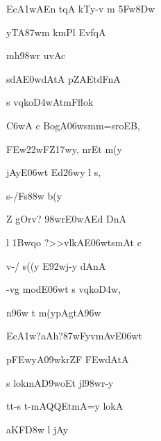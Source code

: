 \dnnemslokac 
{\dn Ec\3A1wAEn t\?qA\2 kTy-v m\? \35Fw\38Dw}
\dontdisplaylinenum

\dnnemslokad 
{\dn yTA\387wm\2 km\0Pl\2 Evf\?qA \vegdn\dontdisplaylinenum}


\dnvers

{\dn mh\?\398wr uvAc{\dandabdn}\dontdisplaylinenum }

\nemsloka

\dnnemsloka 
{\dn sdA\3E0wdAtA pZAEt\0dFnA\2}
\dontdisplaylinenum

\dnnemslokab 
{\dn s vq\0ko\3D4wAtmFflok\? \dandadn\dontdisplaylinenum}

\dnnemslokac 
{\dn {}\3C6wA c BogA\306wsmm=sroEB,}
\dontdisplaylinenum

\dnnemslokad 
{\dn \3FEw\322wFZ\317wy, nr\?Et m(y\0 \vegdn\dontdisplaylinenum}


\ujvers\dnnemsloka 
{\dn jAyE\306wt Ed\326wy\? l\? \2s,}
\dontdisplaylinenum

\dnnemslokab 
{\dn s-/Fs\388w\? b(y \dandadn\dontdisplaylinenum}

\dnnemslokac 
{\dn {}Z\?{\qvb} gOrv{\rs ?\re} \398wr\3E0wAEd DnA}
\dontdisplaylinenum

\dnnemslokad 
{\dn {}l\? \31Bwqo {\rs ?\re}>>vlkAE\306wtsmAt\2 c \vegdn\dontdisplaylinenum }


\ujvers\dnnemsloka 
{\dn v-/\2 s((y E\392wj-y dAnA}
\dontdisplaylinenum

\dnnemslokab 
{\dn -vg\?{\qvb} modE\306wt s vq\0ko\3D4w, \dandadn\dontdisplaylinenum}

\dnnemslokac 
{\dn {}n\396w t\? m(y\0pAgtA\396w}
\dontdisplaylinenum

\dnnemslokad 
{\dn Ec\3A1w{\rs ?\re}aAh{\rs ?\re}\387wFyvmAvE\306wt \vegdn\dontdisplaylinenum}


\ujvers\dnnemsloka 
{\dn {}p\3FEwyA\309wkrZF \3FEwdAtA}
\dontdisplaylinenum

\dnnemslokab 
{\dn s lokmA\3D9woEt jl\?\398wr-y \dandadn\dontdisplaylinenum}

\dnnemslokac 
{\dn tt-s t-mAQQEtmA=y lokA}
\dontdisplaylinenum

\dnnemslokad 
{\dn aKF\3D8w\? l\? jAy\? \vegdn\dontdisplaylinenum}



